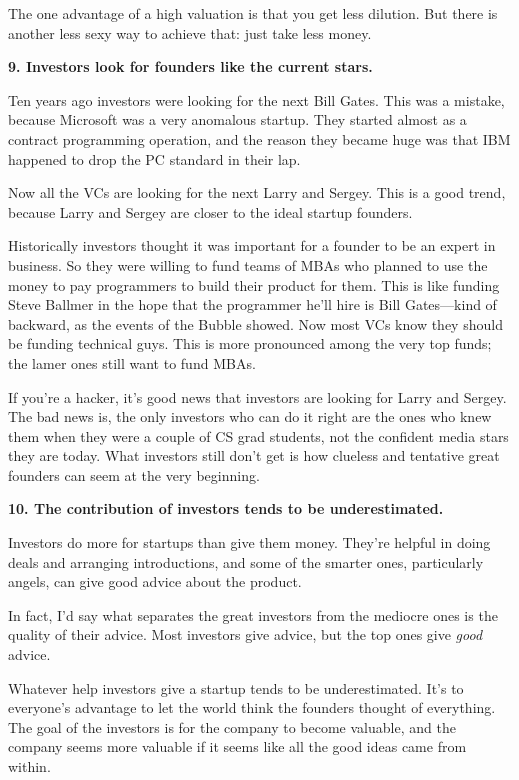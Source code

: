 The one advantage of a high valuation is that you get less dilution. But
there is another less sexy way to achieve that: just take less money.

\textbf{9. Investors look for founders like the current stars.}

Ten years ago investors were looking for the next Bill Gates. This was a
mistake, because Microsoft was a very anomalous startup. They started
almost as a contract programming operation, and the reason they became
huge was that IBM happened to drop the PC standard in their lap.

Now all the VCs are looking for the next Larry and Sergey. This is a
good trend, because Larry and Sergey are closer to the ideal startup
founders.

Historically investors thought it was important for a founder to be an
expert in business. So they were willing to fund teams of MBAs who
planned to use the money to pay programmers to build their product for
them. This is like funding Steve Ballmer in the hope that the programmer
he'll hire is Bill Gates---kind of backward, as the events of the Bubble
showed. Now most VCs know they should be funding technical guys. This is
more pronounced among the very top funds; the lamer ones still want to
fund MBAs.

If you're a hacker, it's good news that investors are looking for Larry
and Sergey. The bad news is, the only investors who can do it right are
the ones who knew them when they were a couple of CS grad students, not
the confident media stars they are today. What investors still don't get
is how clueless and tentative great founders can seem at the very
beginning.

\textbf{10. The contribution of investors tends to be underestimated.}

Investors do more for startups than give them money. They're helpful in
doing deals and arranging introductions, and some of the smarter ones,
particularly angels, can give good advice about the product.

In fact, I'd say what separates the great investors from the mediocre
ones is the quality of their advice. Most investors give advice, but the
top ones give \emph{good} advice.

Whatever help investors give a startup tends to be underestimated. It's
to everyone's advantage to let the world think the founders thought of
everything. The goal of the investors is for the company to become
valuable, and the company seems more valuable if it seems like all the
good ideas came from within.

